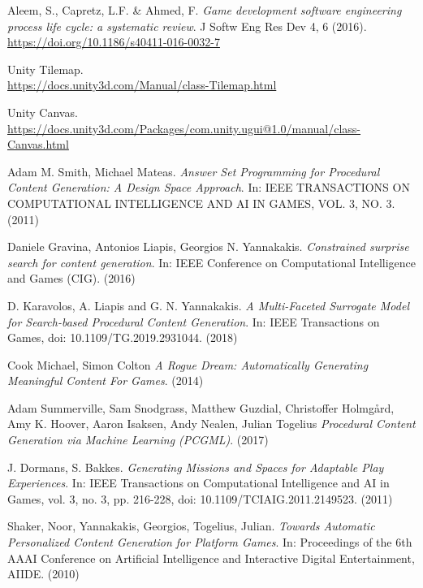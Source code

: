 \begin{thebibliography}{9}
 Aleem, S., Capretz, L.F. \& Ahmed, F. \textit{Game development software engineering process life cycle: a systematic review}. J Softw Eng Res Dev 4, 6 (2016).\\
\href{https://doi.org/10.1186/s40411-016-0032-7}{https://doi.org/10.1186/s40411-016-0032-7}

 Unity Tilemap.\\
\href{https://docs.unity3d.com/Manual/class-Tilemap.html}{https://docs.unity3d.com/Manual/class-Tilemap.html}

 Unity Canvas.\\
\href{https://docs.unity3d.com/Packages/com.unity.ugui@1.0/manual/class-Canvas.html}{https://docs.unity3d.com/Packages/com.unity.ugui@1.0/manual/class-Canvas.html}

 Adam M. Smith, Michael Mateas. \textit{Answer Set Programming for Procedural Content
Generation: A Design Space Approach}. In: IEEE TRANSACTIONS ON COMPUTATIONAL INTELLIGENCE AND AI IN GAMES, VOL. 3, NO. 3. (2011)

  Daniele Gravina, Antonios Liapis, Georgios N. Yannakakis. \textit{ Constrained surprise search for content generation}. In: IEEE Conference on Computational Intelligence and Games (CIG). (2016)

  D. Karavolos, A. Liapis and G. N. Yannakakis. \textit{A Multi-Faceted Surrogate Model for Search-based Procedural Content Generation}. In: IEEE Transactions on Games, doi: 10.1109/TG.2019.2931044. (2018)

  Cook Michael,  Simon Colton \textit{A Rogue Dream: Automatically Generating Meaningful Content For Games}. (2014)

 Adam Summerville, Sam Snodgrass, Matthew Guzdial, Christoffer Holmgård, Amy K. Hoover, Aaron Isaksen, Andy Nealen, Julian Togelius \textit{Procedural Content Generation via Machine Learning (PCGML)}. (2017)

 J. Dormans, S. Bakkes. \textit{Generating Missions and Spaces for Adaptable Play Experiences}. In: IEEE Transactions on Computational Intelligence and AI in Games, vol. 3, no. 3, pp. 216-228, doi: 10.1109/TCIAIG.2011.2149523. (2011)

 Shaker, Noor, Yannakakis, Georgios, Togelius, Julian. \textit{Towards Automatic Personalized Content Generation for Platform Games}. In: Proceedings of the 6th AAAI Conference on Artificial Intelligence and Interactive Digital Entertainment, AIIDE. (2010)


\end{thebibliography}
